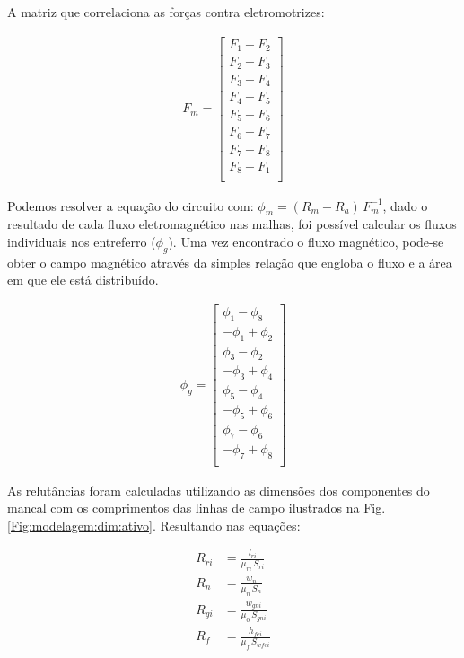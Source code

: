 A matriz que correlaciona as forças contra eletromotrizes:

\begin{align}
F_m = 
\begin{bmatrix}
	F_1 - F_2 \\
	F_2 - F_3 \\
	F_3 - F_4 \\
	F_4 - F_5 \\
	F_5 - F_6 \\
	F_6 - F_7 \\
	F_7 - F_8 \\
	F_8 - F_1 \\
\end{bmatrix}
\end{align}

Podemos resolver a equação do circuito com: $ \phi_m = (R_m - R_a) \, F_m^{-1}$, dado o resultado de cada fluxo eletromagnético nas malhas, foi possível calcular os fluxos individuais nos entreferro ($\phi_{g}$). Uma vez encontrado o fluxo magnético, pode-se obter o campo magnético através da simples relação que engloba o fluxo e a área em que ele está distribuído.

\begin{align}
	\phi_g = 
	\begin{bmatrix}
		 \phi_1 - \phi_8 \\
		-\phi_1 + \phi_2 \\ 
		\phi_3 - \phi_2 \\ 
		-\phi_3 + \phi_4 \\ 
		\phi_5 - \phi_4 \\ 
		-\phi_5 + \phi_6 \\ 
		\phi_7- \phi_6  \\
		-\phi_7+ \phi_8 \\
	\end{bmatrix}
	\label{eq:ativo:fluxo:entreferro}
\end{align}

As relutâncias foram calculadas utilizando as dimensões dos componentes do mancal com os comprimentos das linhas de campo ilustrados na Fig. \ref{Fig:modelagem:dim:ativo}. Resultando nas equações:

\begin{align}
R_{ri}  &= \frac{l_{ri}}{\mu_{ri} \, S_{ri}}			\\
R_{n} &= \frac{w_{n}}{\mu_{n}\, S_{n}}  \\     
R_{gi} &= \frac{w_{gni}}{\mu_{0}\, S_{gni}}   \\    
R_{f} &= \frac{h_{fei}}{\mu_{f} \, S_{wfei}}    
\end{align}



